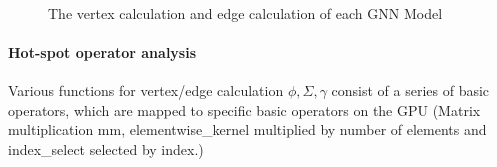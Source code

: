 \begin{figure}
	\centering
    \\
    \caption{The vertex calculation and edge calculation of each GNN Model}
	\label{fig:exp_edge_calc_decomposition}
\end{figure}

\paragraph{Hot-spot operator analysis}
Various functions for vertex/edge calculation $\phi, \Sigma,\gamma$ consist of a series of basic operators,
which are mapped to specific basic operators on the GPU (Matrix multiplication mm, elementwise\_kernel multiplied by number of elements and index\_select selected by index.)

